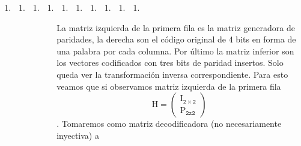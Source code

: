 \begin{enumerate}
\def\labelenumi{\arabic{enumi}.}
\setcounter{enumi}{4}
\item
  \begin{enumerate}
  \def\labelenumii{\arabic{enumii}.}
  \item
    \begin{enumerate}
    \def\labelenumiii{\arabic{enumiii}.}
    \item
      \begin{enumerate}
      \def\labelenumiv{\arabic{enumiv}.}
      \item
        \begin{enumerate}
        \def\labelenumv{\arabic{enumv}.}
        \tightlist
        \item
          \begin{enumerate}
          \def\labelenumvi{\arabic{enumvi}.}
          \tightlist
          \item
            \begin{enumerate}
            \def\labelenumvii{\arabic{enumvii}.}
            \tightlist
            \item
              \begin{enumerate}
              \def\labelenumviii{\arabic{enumviii}.}
              \tightlist
              \item
                \begin{enumerate}
                \def\labelenumix{\arabic{enumix}.}
                \tightlist
                \item
                  \begin{enumerate}
                  \def\labelenumx{\arabic{enumx}.}
                  \tightlist
                  \item
                  \end{enumerate}
                \end{enumerate}
              \end{enumerate}
            \end{enumerate}
          \end{enumerate}
        \end{enumerate}

        La matriz izquierda de la primera fila es la matriz generadora
        de paridades, la de\-recha son el código original de 4 bits en
        forma de una palabra por cada columna. Por último la matriz
        inferior son los vectores codificados con tres bits de paridad
        insertos. Solo queda ver la transformación inversa
        correspondiente. Para esto vea\-mos que si observamos matriz
        izquierda de la primera
        fila\[\mathtt{\mathrm{H}} = \begin{pmatrix}
        \mathtt{\mathrm{I}_{2 \times 2}} \\
        \mathtt{\mathrm{P}_{2x2}}
        \end{pmatrix}\]. Tomare\-mos como matriz decodificadora (no
        necesariamente inyectiva) a


\end{enumerate}
\end{enumerate}
\end{enumerate}
\end{enumerate}
